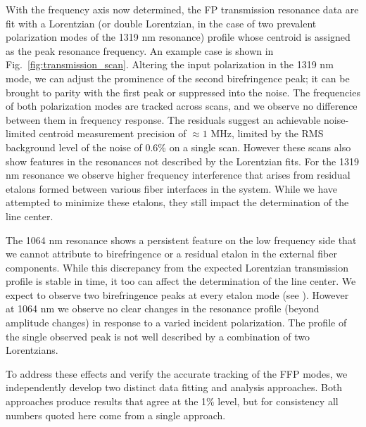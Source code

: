 \documentclass[10pt]{article}
\begin{document}
With the frequency axis now determined, the FP transmission resonance data are fit with a Lorentzian (or double Lorentzian, in the case of two prevalent polarization modes of the 1319 nm resonance) profile whose centroid is assigned as the peak resonance frequency. An example case is shown in Fig.~\ref{fig:transmission_scan}. Altering the input polarization in the 1319 nm mode, we can adjust the prominence of the second birefringence peak; it can be brought to parity with the first peak or suppressed into the noise. The frequencies of both polarization modes are tracked across scans, and we observe no difference between them in frequency response. The residuals suggest an achievable noise-limited centroid measurement precision of  $\approx 1$ MHz, limited by the RMS background level of the noise of 0.6\% on a single scan. However these scans also show features in the resonances not described by the Lorentzian fits.  For the 1319 nm resonance we observe higher frequency interference that arises from residual etalons formed between various fiber interfaces in the system.  While we have attempted to minimize these etalons, they still impact the determination of the line center. 

The 1064 nm resonance shows a persistent feature on the low frequency side that we cannot attribute to birefringence or a residual etalon in the external fiber components.  While this discrepancy from the expected Lorentzian transmission profile is stable in time, it too can affect the determination of the line center. We expect to observe two birefringence peaks at every etalon mode (see \cite{Halverson:2014a}). However at 1064 nm we observe no clear changes in the resonance profile (beyond amplitude changes) in response to a varied incident polarization. The profile of the single observed peak is not well described by a combination of two Lorentzians.

To address these effects and verify the accurate tracking of the FFP modes, we independently develop two distinct data fitting and analysis approaches. Both approaches produce results that agree at the 1\% level, but for consistency all numbers quoted here come from a single approach.
\end{document}
